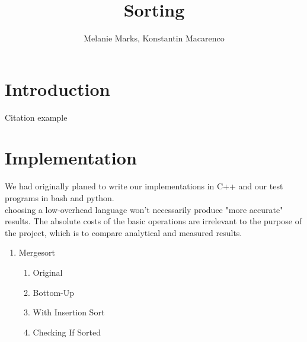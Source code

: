 \documentclass{article}
\title{Sorting}
\author{
    Melanie Marks, Konstantin Macarenco\\
}
\begin{document}
\maketitle
\thispagestyle{plain}
\pagestyle{plain}
\begin{abstract}

\end{abstract}
\tableofcontents
\section{Introduction}\label{sec:intro}
Citation example\cite{ABOOK}


\pagebreak
\section{Implementation}\label{sec:Implementation}
We had originally planed to write our implementations in C++ and our test programs in bash and python.  \\
choosing a low-overhead language won't necessarily produce "more accurate" results.  The absolute costs of the basic operations are irrelevant to the purpose of the project, which is to compare analytical and measured results.



\begin{enumerate}
\item Mergesort
\begin{enumerate}
\item Original
\item Bottom-Up
\item With Insertion Sort
\item Checking If Sorted
\end{enumerate}

\end{enumerate}
\end{document}
